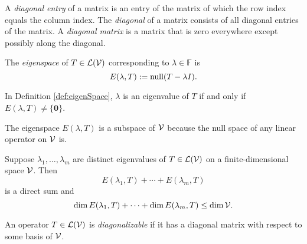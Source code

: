 \begin{defn}
  A \emph{diagonal entry} of a matrix
  is an entry of the matrix of which the row index
  equals the column index.
  The \emph{diagonal} of a matrix
  consists of all diagonal entries of the matrix.
  A \emph{diagonal matrix} is a matrix
  that is zero everywhere except possibly
  along the diagonal.
\end{defn}

\begin{defn}
  \label{def:eigenSpace}
  The \emph{eigenspace} of $T\in {\cal L}({\cal V})$
  corresponding to $\lambda\in \mathbb{F}$ is
  \begin{equation}
    \label{eq:eigenSpace}
    E(\lambda, T) := \mathrm{null}(T-\lambda I).
  \end{equation}
\end{defn}

\begin{rem}
  In Definition \ref{def:eigenSpace}, 
  $\lambda$ is an eigenvalue of $T$
  if and only if $E(\lambda,T)\ne \{\mathbf{0}\}$.
\end{rem}

\begin{rem}
  The eigenspace $E(\lambda,T)$
  is a subspace of ${\cal V}$
  because the null space of any linear operator on ${\cal V}$ is.
\end{rem}

\begin{lem}
  Suppose $\lambda_1, \ldots, \lambda_m$ are distinct eigenvalues
  of $T\in {\cal L}({\cal V})$
  on a finite-dimensional space ${\cal V}$.
  Then
  \begin{displaymath}
    E(\lambda_1, T) + \cdots + E(\lambda_m, T) 
  \end{displaymath}
  is a direct sum and
  \begin{equation}
    \dim E(\lambda_1, T) + \cdots + \dim E(\lambda_m, T) \le \dim {\cal V}.
  \end{equation}
\end{lem}

\begin{defn}
  An operator $T\in {\cal L}({\cal V})$ is \emph{diagonalizable}
  if it has a diagonal matrix with respect to some basis of ${\cal V}$.
\end{defn}

